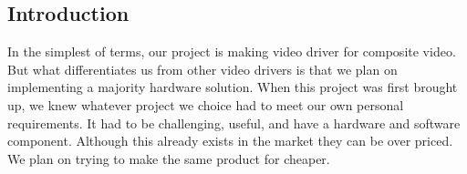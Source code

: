 \subsection*{Introduction}

In the simplest of terms, our project is making video driver for composite
video. But what differentiates us from other video drivers is that we plan on 
implementing a majority hardware solution. When this project was first 
brought up, we knew whatever project we choice had to meet our own personal
requirements. It had to be challenging, useful, and have a hardware and 
software component. Although this already exists in the market they can be over
priced. We plan on trying to make the same product for cheaper.  
